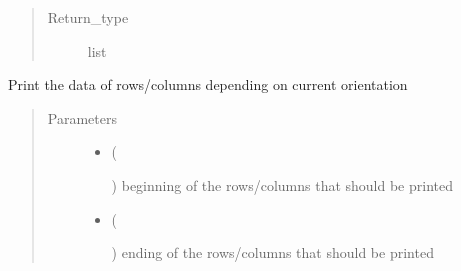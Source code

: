 \documentclass[a4paper,10pt,english]{sphinxmanual}
\begin{document}
\begin{fulllineitems}
\begin{fulllineitems}
\begin{quote}
\begin{description}
\item[{Return\_type}] \leavevmode
list

\end{description}\end{quote}

\end{fulllineitems}


\begin{fulllineitems}
\label{\detokenize{drc/drc:kppc.drc.kppc.drc.slcleaner.PyDrcSl.printvector}}
Print the data of rows/columns depending on current orientation
\begin{quote}\begin{description}
\item[{Parameters}] \leavevmode\begin{itemize}
\item {} 
 (%
\begin{footnote}[18]\sphinxAtStartFootnote
{}
%
\end{footnote}) \textendash{} beginning of the rows/columns that should be printed

\item {} 
 (%
\begin{footnote}[19]\sphinxAtStartFootnote
{}
%
\end{footnote}) \textendash{} ending of the rows/columns that should be printed

\end{itemize}

\end{description}\end{quote}

\end{fulllineitems}



\end{fulllineitems}
\end{document}
